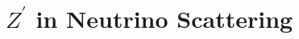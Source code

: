 \documentclass[twoside,openright,frontopenright]{ip3thesis}
\begin{document}
\chapter{$Z^\prime$ in Neutrino Scattering}

%
%
%
%

\appendix
%
%



\end{document}

